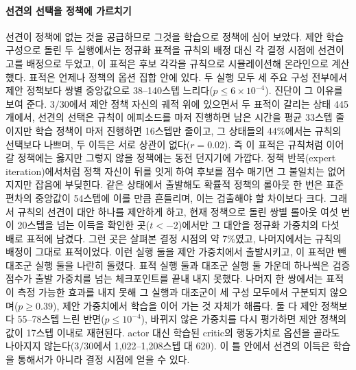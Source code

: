 \documentclass[final,5p,times,twocolumn]{elsarticle}
\begin{document}
\paragraph{선견의 선택을 정책에 가르치기}
선견이 정책에 없는 것을 공급하므로 그것을 학습으로 정책에 심어 보았다. 제안 학습 구성으로 돌린 두
실행에서는 정규화 표적을 규칙의 배정 대신 각 결정 시점에 선견이 고를 배정으로 두었고, 이 표적은 후보
각각을 규칙으로 시뮬레이션해 온라인으로 계산했다. 표적은 언제나 정책의 옵션 집합 안에 있다. 두 실행
모두 세 주요 구성 전부에서 제안 정책보다 쌍별 중앙값으로 38--140스텝
느리다($p \le 6 \times 10^{-4}$). 진단이 그 이유를 보여 준다. $3/30$에서 제안 정책 자신의 궤적 위에
있으면서 두 표적이 갈리는 상태 445개에서, 선견의 선택은 규칙이 에피소드를 마저 진행하면 남은 시간을
평균 33스텝 줄이지만 학습 정책이 마저 진행하면 16스텝만 줄이고, 그 상태들의 44\%에서는 규칙의
선택보다 나쁘며, 두 이득은 서로 상관이 없다($r = 0.02$). 즉 이 표적은 규칙처럼 이어 갈 정책에는
옳지만 그렇지 않을 정책에는 동전 던지기에 가깝다. 정책 반복(expert iteration)에서처럼 정책 자신이
뒤를 잇게 하여 후보를 점수 매기면 그 불일치는 없어지지만 잡음에 부딪힌다. 같은 상태에서 출발해도
확률적 정책의 롤아웃 한 번은 표준편차의 중앙값이 54스텝에 이를 만큼 흔들리며, 이는 검출해야 할
차이보다 크다. 그래서 규칙의 선견이 대안 하나를 제안하게 하고, 현재 정책으로 돌린 쌍별 롤아웃 여섯
번이 20스텝을 넘는 이득을 확인한 곳($t < -2$)에서만 그 대안을 정규화 가중치의 다섯 배로 표적에
남겼다. 그런 곳은 살펴본 결정 시점의 약 7\%였고, 나머지에서는 규칙의 배정이 그대로 표적이었다. 이런
실행 둘을 제안 가중치에서 출발시키고, 이 표적만 뺀 대조군 실행 둘을 나란히 돌렸다. 표적 실행 둘과
대조군 실행 둘 가운데 하나씩은 검증 점수가 출발 가중치를 넘는 체크포인트를 끝내 내지 못했다. 나머지
한 쌍에서는 표적이 측정 가능한 효과를 내지 못해 그 실행과 대조군이 세 구성 모두에서 구분되지
않으며($p \ge 0.39$), 제안 가중치에서 학습을 이어 가는 것 자체가 해롭다. 둘 다 제안 정책보다
55--78스텝 느린 반면($p \le 10^{-4}$), 바뀌지 않은 가중치를 다시 평가하면 제안 정책의 값이 17스텝
이내로 재현된다. actor 대신 학습된 critic의 행동가치로 옵션을 골라도 나아지지 않는다($3/30$에서
1{,}022--1{,}208스텝 대 620). 이 틀 안에서 선견의 이득은 학습을 통해서가 아니라 결정 시점에 얻을 수
있다.
\end{document}

